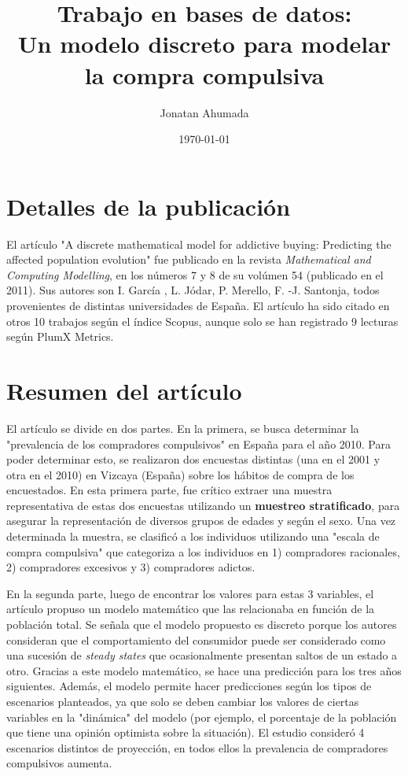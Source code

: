 \documentclass[11pt]{article}
\author{Jonatan Ahumada}
\date{\today}
\title{Trabajo en bases de datos:\\
Un modelo discreto para modelar la compra compulsiva}
\begin{document}
\maketitle



\section{Detalles de la publicación}
\label{sec-1}

El artículo "A discrete mathematical model for addictive buying: Predicting
the affected population evolution" fue publicado en la revista \emph{Mathematical and
Computing Modelling}, en los números 7 y 8 de su volúmen 54 (publicado en el 2011).
Sus autores son I. García , L. Jódar, P. Merello, F. -J. Santonja, todos provenientes
de distintas universidades de España. El artículo ha sido citado en otros 10 trabajos según
el índice Scopus, aunque solo se han registrado 9 lecturas según PlumX Metrics.

\section{Resumen del artículo}
\label{sec-2}

El artículo se divide en dos partes. En la primera, se busca determinar la "prevalencia 
de los compradores compulsivos" en España para el año 2010. Para poder determinar esto,
 se realizaron dos encuestas distintas (una en el 2001 y otra en el 2010) en Vizcaya (España) sobre los hábitos de compra de los encuestados. En esta primera parte, fue crítico 
extraer una muestra representativa de estas dos encuestas utilizando un \textbf{muestreo stratificado}, para 
asegurar la representación de diversos grupos de edades y según el sexo. Una vez determinada la muestra, 
se clasificó a los individuos utilizando una "escala de compra compulsiva" que categoriza a los individuos
en 1) compradores racionales, 2) compradores excesivos y 3) compradores adictos. 

En la segunda parte, luego de encontrar los valores para estas 3 variables, el artículo propuso un modelo matemático
que las relacionaba en función de la población total. Se señala que el modelo propuesto
es discreto porque los autores consideran que el comportamiento del consumidor puede ser considerado como una sucesión
de \emph{steady states} que ocasionalmente presentan saltos de un estado a otro. Gracias a este modelo matemático, se hace una predicción
para los tres años siguientes. Además, el modelo permite hacer predicciones según los tipos de escenarios planteados, ya que solo 
se deben cambiar los valores de ciertas variables en la "dinámica" del modelo (por ejemplo, el porcentaje de la población que tiene una opinión
optimista sobre la situación). El estudio consideró 
4 escenarios distintos de proyección, en todos ellos la prevalencia de compradores compulsivos aumenta.
\end{document}

